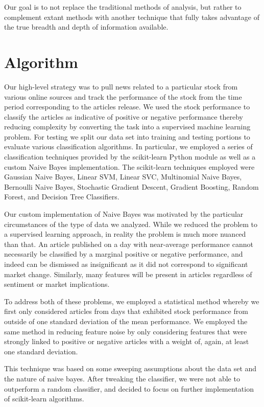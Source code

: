 \documentclass[letterpaper]{article}
\begin{document}
Our goal is to not replace the traditional methods of analysis, but rather to complement extant methods with another technique that fully takes advantage of the true breadth and depth of information available.

\section{Algorithm}
\noindent Our high-level strategy was to pull news related to a particular stock from various online sources and track the performance of the stock from the time period corresponding to the articles release.  We used the stock performance to classify the articles as indicative of positive or negative performance thereby reducing complexity by converting the task into a supervised machine learning problem. For testing we split our data set into training and testing portions to evaluate various classification algorithms. In particular, we employed a series of classification techniques provided by the scikit-learn Python module as well as a custom Naive Bayes implementation.  The scikit-learn techniques employed were Gaussian Naive Bayes, Linear SVM, Linear SVC, Multinomial Naive Bayes, Bernoulli Naive Bayes, Stochastic Gradient Descent, Gradient Boosting, Random Forest, and Decision Tree Classifiers.

Our custom implementation of Naive Bayes was motivated by the particular circumstances of the type of data we analyzed.  While we reduced the problem to a supervised learning approach, in reality the problem is much more nuanced than that. An article published on a day with near-average performance cannot necessarily be classified by a marginal positive or negative performance, and indeed can be dismissed as insignificant as it did not correspond to significant market change. Similarly, many features will be present in articles regardless of sentiment or market implications.

To address both of these problems, we employed a statistical method whereby we first only considered articles from days that exhibited stock performance from outside of one standard deviation of the mean performance. We employed the same method in reducing feature noise by only considering features that were strongly linked to positive or negative articles with a weight of, again, at least one standard deviation.

This technique was based on some sweeping assumptions about the data set and the nature of naive bayes.  After tweaking the classifier, we were not able to outperform a random classifier, and decided to focus on further implementation of scikit-learn algorithms.
\end{document}

